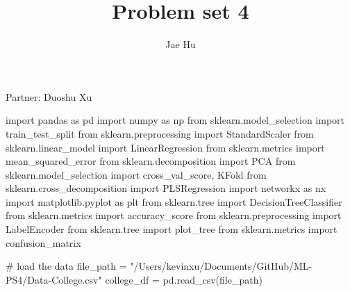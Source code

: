 \documentclass[
  letterpaper,
  DIV=11,
  numbers=noendperiod]{scrartcl}
\title{Problem set 4}
\author{Jae Hu}
\date{}
\newenvironment{Shaded}{\begin{snugshade}}{\end{snugshade}}
\newcommand{\CommentTok}[1]{\textcolor[rgb]{0.37,0.37,0.37}{#1}}
\newcommand{\ImportTok}[1]{\textcolor[rgb]{0.00,0.46,0.62}{#1}}
\newcommand{\NormalTok}[1]{\textcolor[rgb]{0.00,0.23,0.31}{#1}}
\newcommand{\OperatorTok}[1]{\textcolor[rgb]{0.37,0.37,0.37}{#1}}
\newcommand{\StringTok}[1]{\textcolor[rgb]{0.13,0.47,0.30}{#1}}
\begin{document}
\maketitle



Partner: Duoshu Xu

\begin{Shaded}
\begin{Highlighting}[]
\ImportTok{import}\NormalTok{ pandas }\ImportTok{as}\NormalTok{ pd}
\ImportTok{import}\NormalTok{ numpy }\ImportTok{as}\NormalTok{ np}
\ImportTok{from}\NormalTok{ sklearn.model\_selection }\ImportTok{import}\NormalTok{ train\_test\_split}
\ImportTok{from}\NormalTok{ sklearn.preprocessing }\ImportTok{import}\NormalTok{ StandardScaler}
\ImportTok{from}\NormalTok{ sklearn.linear\_model }\ImportTok{import}\NormalTok{ LinearRegression}
\ImportTok{from}\NormalTok{ sklearn.metrics }\ImportTok{import}\NormalTok{ mean\_squared\_error}
\ImportTok{from}\NormalTok{ sklearn.decomposition }\ImportTok{import}\NormalTok{ PCA}
\ImportTok{from}\NormalTok{ sklearn.model\_selection }\ImportTok{import}\NormalTok{ cross\_val\_score, KFold}
\ImportTok{from}\NormalTok{ sklearn.cross\_decomposition }\ImportTok{import}\NormalTok{ PLSRegression}
\ImportTok{import}\NormalTok{ networkx }\ImportTok{as}\NormalTok{ nx}
\ImportTok{import}\NormalTok{ matplotlib.pyplot }\ImportTok{as}\NormalTok{ plt}
\ImportTok{from}\NormalTok{ sklearn.tree }\ImportTok{import}\NormalTok{ DecisionTreeClassifier}
\ImportTok{from}\NormalTok{ sklearn.metrics }\ImportTok{import}\NormalTok{ accuracy\_score}
\ImportTok{from}\NormalTok{ sklearn.preprocessing }\ImportTok{import}\NormalTok{ LabelEncoder}
\ImportTok{from}\NormalTok{ sklearn.tree }\ImportTok{import}\NormalTok{ plot\_tree}
\ImportTok{from}\NormalTok{ sklearn.metrics }\ImportTok{import}\NormalTok{ confusion\_matrix}
\end{Highlighting}
\end{Shaded}

\begin{Shaded}
\begin{Highlighting}[]
\CommentTok{\# load the data}
\NormalTok{file\_path }\OperatorTok{=} \StringTok{"/Users/kevinxu/Documents/GitHub/ML{-}PS4/Data{-}College.csv"}
\NormalTok{college\_df }\OperatorTok{=}\NormalTok{ pd.read\_csv(file\_path)}
\end{Highlighting}
\end{Shaded}
\end{document}
